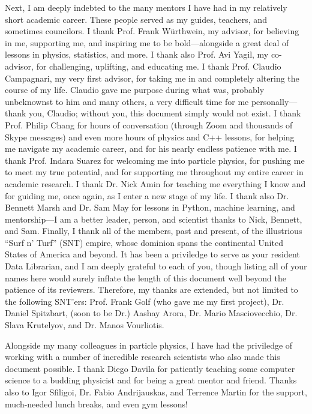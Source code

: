 \begin{acknowledgements}
Next, I am deeply indebted to the many mentors I have had in my relatively short academic career. 
These people served as my guides, teachers, and sometimes councilors. 
I thank Prof. Frank W\"urthwein, my advisor, for believing in me, supporting me, and inspiring me to be bold---alongside a great deal of lessons in physics, statistics, and more. 
I thank also Prof. Avi Yagil, my co-advisor, for challenging, uplifting, and educating me. 
I thank Prof. Claudio Campagnari, my very first advisor, for taking me in and completely altering the course of my life. 
Claudio gave me purpose during what was, probably unbeknownst to him and many others, a very difficult time for me personally---thank you, Claudio; without you, this document simply would not exist. 
I thank Prof. Philip Chang for hours of conversation (through Zoom and thousands of Skype messages) and even more hours of physics and C++ lessons, for helping me navigate my academic career, and for his nearly endless patience with me. 
I thank Prof. Indara Suarez for welcoming me into particle physics, for pushing me to meet my true potential, and for supporting me throughout my entire career in academic research. 
I thank Dr. Nick Amin for teaching me everything I know and for guiding me, once again, as I enter a new stage of my life. 
I thank also Dr. Bennett Marsh and Dr. Sam May for lessons in Python, machine learning, and mentorship---I am a better leader, person, and scientist thanks to Nick, Bennett, and Sam. 
Finally, I thank all of the members, past and present, of the illustrious ``Surf n' Turf'' (SNT) empire, whose dominion spans the continental United States of America and beyond. 
It has been a priviledge to serve as your resident Data Librarian, and I am deeply grateful to each of you, though listing all of your names here would surely inflate the length of this document well beyond the patience of its reviewers. 
Therefore, my thanks are extended, but not limited to the following SNT'ers: Prof. Frank Golf (who gave me my first project), Dr. Daniel Spitzbart, (soon to be Dr.) Aashay Arora, Dr. Mario Masciovecchio, Dr. Slava Krutelyov, and Dr. Manos Vourliotis.

Alongside my many colleagues in particle physics, I have had the priviledge of working with a number of incredible research scientists who also made this document possible. 
I thank Diego Davila for patiently teaching some computer science to a budding physicist and for being a great mentor and friend. 
Thanks also to Igor Sfiligoi, Dr. Fabio Andrijauskas, and Terrence Martin for the support, much-needed lunch breaks, and even gym lessons! 


\end{acknowledgements}
